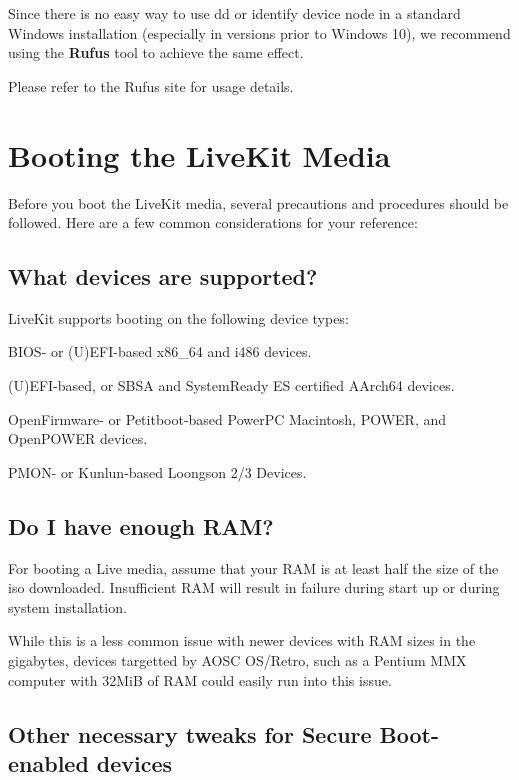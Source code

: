     Since there is no easy way to use dd or identify device node in a standard Windows installation
    (especially in versions prior to Windows 10), we recommend using the \textbf{Rufus} tool to achieve the same effect.

    Please refer to the Rufus site for usage details.

    \section{Booting the LiveKit Media}
    
    Before you boot the LiveKit media, several precautions and procedures should be followed. Here are a few common considerations for your reference:
    
    \subsection{What devices are supported?}

    LiveKit supports booting on the following device types:

    \begin{compactitem}
        \item BIOS- or (U)EFI-based x86\_64 and i486 devices.
        \item (U)EFI-based, or SBSA and SystemReady ES certified AArch64 devices.
        \item OpenFirmware- or Petitboot-based PowerPC Macintosh, POWER, and OpenPOWER devices.
        \item PMON- or Kunlun-based Loongson 2/3 Devices.
    \end{compactitem}

    \subsection{Do I have enough RAM?}
    
    For booting a Live media, assume that your RAM is at least half the size of the iso downloaded. Insufficient RAM will result in failure during start up or during system installation.

    While this is a less common issue with newer devices with RAM sizes in the gigabytes, devices targetted by AOSC OS/Retro, such as a Pentium MMX computer with 32MiB of RAM could easily run into this issue.

    \subsection{Other necessary tweaks for Secure Boot-enabled devices}

